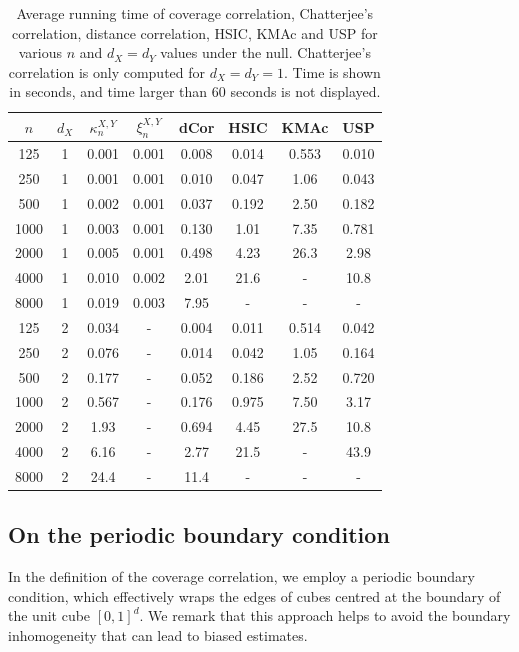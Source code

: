 \documentclass[11pt]{article}
\begin{document}
\begin{table}
\begin{center}
    \begin{tabular}{cccccccc}
    $n$ & $d_X$ & $\kappa_n^{X,Y}$ & $\xi_n^{X,Y}$ & dCor & HSIC & KMAc & USP\\
    \hline
    125 & 1 & 0.001 & 0.001 & 0.008 & 0.014 & 0.553 & 0.010\\
    250 & 1 & 0.001 & 0.001 & 0.010 & 0.047 & 1.06 & 0.043\\
    500 & 1 & 0.002 & 0.001 & 0.037 & 0.192 & 2.50 & 0.182\\
    1000 & 1 & 0.003 & 0.001 & 0.130 & 1.01 & 7.35 & 0.781 \\
    2000 & 1 & 0.005 & 0.001 & 0.498 & 4.23 & 26.3 & 2.98 \\
    4000 & 1 & 0.010 & 0.002 & 2.01 & 21.6 & - & 10.8 \\
    8000 & 1 & 0.019 & 0.003 & 7.95 & - & - & - \\
    125 & 2 & 0.034 & - & 0.004 & 0.011 & 0.514 & 0.042\\
    250 & 2 & 0.076 & - & 0.014 & 0.042 & 1.05 & 0.164 \\
    500 & 2 & 0.177 & - & 0.052 & 0.186 & 2.52 & 0.720\\
    1000 & 2 & 0.567 & - & 0.176 & 0.975 & 7.50 & 3.17\\
    2000 & 2 & 1.93 & - & 0.694 & 4.45 & 27.5 & 10.8 \\
    4000 & 2 & 6.16 & - & 2.77 & 21.5 & - & 43.9\\
    8000 & 2 & 24.4 & - & 11.4 & - & - & -
    \end{tabular}
    \caption{\label{Tab:Timing}Average running time of coverage correlation, Chatterjee's correlation, distance correlation, HSIC, KMAc and USP for various $n$ and $d_X=d_Y$ values under the null. Chatterjee's correlation is only computed for $d_X=d_Y=1$. Time is shown in seconds, and time larger than 60 seconds is not displayed.}
    \end{center}
\end{table}

\subsection{On the periodic boundary condition}\label{sec:no-wrapping}

In the definition of the coverage correlation, we employ a periodic boundary condition, which effectively wraps the edges of cubes centred at the boundary of the unit cube $[0, 1]^d$. We remark that this approach helps to avoid the boundary inhomogeneity that can lead to biased estimates. 
\end{document}
